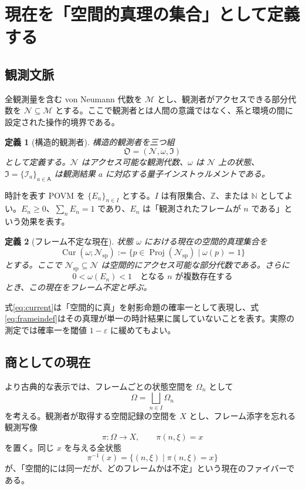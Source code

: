 \documentclass[a4paper,11pt]{ltjsarticle}
\newtheorem{definition}{定義}[section]
\theoremstyle{remark}
\newcommand{\M}{\mathcal{M}}
\newcommand{\N}{\mathcal{N}}
\newcommand{\Z}{\mathbb{Z}}
\newcommand{\Proj}{\operatorname{Proj}}
\newcommand{\Cur}{\operatorname{Cur}}
\begin{document}
\section{現在を「空間的真理の集合」として定義する}

\subsection{観測文脈}
全観測量を含む von Neumann 代数を $\M$ とし、観測者がアクセスできる部分代数を $\N\subseteq\M$ とする。ここで観測者とは人間の意識ではなく、系と環境の間に設定された操作的境界である。

\begin{definition}[構造的観測者]
構造的観測者を三つ組
\begin{equation}
 \mathfrak O=(\N,\omega,\mathfrak I)
\end{equation}
として定義する。$\N$ はアクセス可能な観測代数、$\omega$ は $\N$ 上の状態、$\mathfrak I=\{\mathcal I_a\}_{a\in\mathsf A}$ は観測結果 $a$ に対応する量子インストゥルメントである。
\end{definition}

時計を表す POVM を $\{E_n\}_{n\in I}$ とする。$I$ は有限集合、$\Z$、または $\mathbb N$ としてよい。$E_n\geq0$、$\sum_nE_n=1$ であり、$E_n$ は「観測されたフレームが $n$ である」という効果を表す。

\begin{definition}[フレーム不定な現在]
状態 $\omega$ における現在の空間的真理集合を
\begin{equation}
 \Cur(\omega;\N_{\mathrm{sp}})
 :=\{p\in\Proj(\N_{\mathrm{sp}})\mid \omega(p)=1\}
 \label{eq:current}
\end{equation}
とする。ここで $\N_{\mathrm{sp}}\subseteq\N$ は空間的にアクセス可能な部分代数である。さらに
\begin{equation}
 0<\omega(E_n)<1
 \quad\text{となる }n\text{ が複数存在する}
 \label{eq:frameindef}
\end{equation}
とき、この現在を\emph{フレーム不定}と呼ぶ。
\end{definition}

式\eqref{eq:current}は「空間的に真」を射影命題の確率一として表現し、式\eqref{eq:frameindef}はその真理が単一の時計結果に属していないことを表す。実際の測定では確率一を閾値 $1-\varepsilon$ に緩めてもよい。

\subsection{商としての現在}
より古典的な表示では、フレームごとの状態空間を $\Omega_n$ として
\begin{equation}
 \Omega=\bigsqcup_{n\in I}\Omega_n
\end{equation}
を考える。観測者が取得する空間記録の空間を $X$ とし、フレーム添字を忘れる観測写像
\begin{equation}
 \pi:\Omega\longrightarrow X,
 \qquad \pi(n,\xi)=x
 \label{eq:forget}
\end{equation}
を置く。同じ $x$ を与える全状態
\begin{equation}
 \pi^{-1}(x)=\{(n,\xi)\mid \pi(n,\xi)=x\}
\end{equation}
が、「空間的には同一だが、どのフレームかは不定」という現在のファイバーである。
\end{document}
